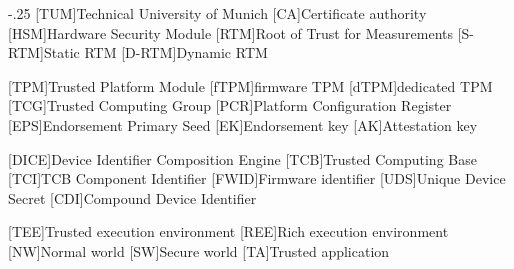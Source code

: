 \documentclass[headsepline,footsepline,footinclude=false,fontsize=11pt,paper=a4,listof=totoc,bibliography=totoc,BCOR=12mm,DIV=12]{scrbook} %
\begin{document}


\frontmatter{}





\tableofcontents{}

\mainmatter{}

%








\appendix{}


\begin{acronym}
	\itemsep-.25\baselineskip
	[TUM]{Technical University of Munich}
	[CA]{Certificate authority}
	[HSM]{Hardware Security Module}
	[RTM]{Root of Trust for Measurements}
	[S-RTM]{Static \ac{RTM}}
	[D-RTM]{Dynamic \ac{RTM}}

	[TPM]{Trusted Platform Module}
	[fTPM]{firmware TPM}
	[dTPM]{dedicated TPM}
	[TCG]{Trusted Computing Group}
	[PCR]{Platform Configuration Register}
	[EPS]{Endorsement Primary Seed}
	[EK]{Endorsement key}
	[AK]{Attestation key}

	[DICE]{Device Identifier Composition Engine}
	[TCB]{Trusted Computing Base}
	[TCI]{TCB Component Identifier}
	[FWID]{Firmware identifier}
	[UDS]{Unique Device Secret}
	[CDI]{Compound Device Identifier}

	[TEE]{Trusted execution environment}
	[REE]{Rich execution environment}
	[NW]{Normal world}
	[SW]{Secure world}
	[TA]{Trusted application}
\end{acronym}

\listoffigures{}
\listoftables{}
\printbibliography{}
\end{document}
